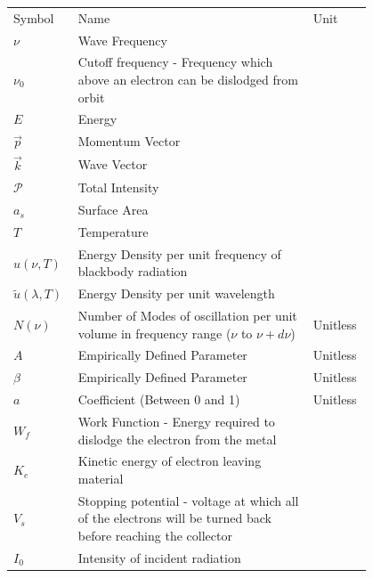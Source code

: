\documentclass[10pt]{article}
\begin{document}
        \begin{table}
        \centering
            \begin{tabular}{|>{\centering\arraybackslash}p{0.1\linewidth}  |>{\centering\arraybackslash}p{0.6\linewidth}  |>{\centering\arraybackslash}p{0.1\linewidth}|} \hline
                \multicolumn{3}{|c|}{Variables}\\ \hline 
                Symbol  &   Name    &   Unit\\ \hline 
                $\nu$   &   Wave Frequency  &   [$Hz$]\\ \hline 
 $\nu_0$& Cutoff frequency - Frequency which above an electron can be dislodged from orbit&[$Hz$]\\\hline \hline 
                $E$     &   Energy  &\\ \hline 
                $\vec{p}$   &   Momentum Vector &\\ \hline 
                $\vec{k}$ & Wave Vector&\\ \hline 
                $\mathcal{P}$   &   Total Intensity   &   [$\frac{W}{m^2}$]\\ \hline 
                $a_s$   &   Surface Area    &   [$m^2$]\\ \hline 
                $T$     &   Temperature     &   [$K$]\\ \hline 
                $u(\nu, T)$&   Energy Density per unit frequency of blackbody radiation    &   [$\frac{J}{m^3 Hz}$]\\ \hline 
                $\tilde{u}(\lambda, T)$     &   Energy Density per unit wavelength  &   \\ \hline 
                $N(\nu)$    &   Number of Modes of oscillation per unit volume in frequency range ($\nu$ to $\nu+d\nu$) &   Unitless\\ \hline 
                $A$     &   Empirically Defined Parameter   &   Unitless\\ \hline 
                $\beta$ &   Empirically Defined Parameter   &   Unitless\\ \hline 
                $a$     &   Coefficient (Between 0 and 1)   &   Unitless\\ \hline
                $W_f$   &   Work Function - Energy required to dislodge the electron from the metal &   \\\hline
                $K_e$   &   Kinetic energy of electron leaving material &   \\\hline
                $V_{s}$ &   Stopping potential - voltage at which all of the electrons will be turned back before reaching the collector    &\\ \hline
 $I_{0}$& Intensity of incident radiation&\\\hline
            \end{tabular}
        \label{tab:var}
        \end{table}
\end{document}

